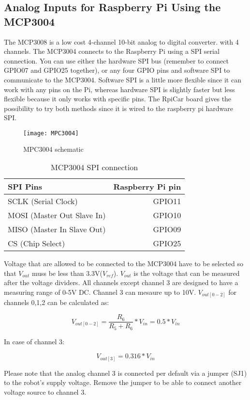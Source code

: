 \documentclass[
12pt, %
a4paper, %
oneside, %
headinclude,footinclude, %
BCOR5mm, %
]{scrartcl}
\begin{document}
\subsection{Analog Inputs for Raspberry Pi Using the MCP3004}
The MCP3008 is a low cost 4-channel 10-bit analog to digital converter.  with 4 channels. The MCP3004 connects to the Raspberry Pi using a SPI serial connection. You can use either the hardware SPI bus (remember to connect GPIO07 and GPIO25 together), or any four GPIO pins and software SPI to communicate to the MCP3004. Software SPI is a little more flexible since it can work with any pins on the Pi, whereas hardware SPI is slightly faster but less flexible because it only works with specific pins. The RpiCar board gives the possibility to try both methods since it is wired to the raspberry pi hardware SPI.

\begin{figure}[!htb]
\centering
\texttt{[image: MPC3004]} 
\caption[MPC3004 schematic]{MPC3004 schematic}
\label{fig:MPC3004}
\end{figure}

\begin{table}[hbt]
\caption{MCP3004 SPI connection}
\centering
\begin{tabular}{lr}
\toprule
SPI Pins & Raspberry Pi pin \\
\midrule
SCLK (Serial Clock)        & GPIO11 \\
MOSI (Master Out Slave In) & GPIO10 \\
MISO (Master In Slave Out) & GPIO09 \\
CS   (Chip Select)         & GPIO25 \\
\bottomrule
\end{tabular}
\label{tab:label}
\end{table}
Voltage that are allowed to be connected to the MCP3004 have to be selected so that \(V_{out}\) muss be less than 3.3V(\(V_{ref}\)). \(V_{out}\) is the voltage that can be measured after the voltage dividers. All channels except channel 3 are designed to have a measuring range of 0-5V DC. Channel 3 can mesaure up to 10V.
\(V_{out[0-2]}\) for channels 0,1,2 can be calculated as:

\[ V_{ out[0-2] } = \frac{ R_{6} }{ R_{5} + R_{6} } * V_{in}  = 0.5* V_{in}\]

In case of channel 3:

\[ V_{out[3]} = 0.316 * V_{in}\]

Please note that the analog channel 3 is connected per default via a jumper (SJ1) to the robot's supply voltage. Remove the jumper to be able to connect another voltage source to channel 3. 
\end{document}
